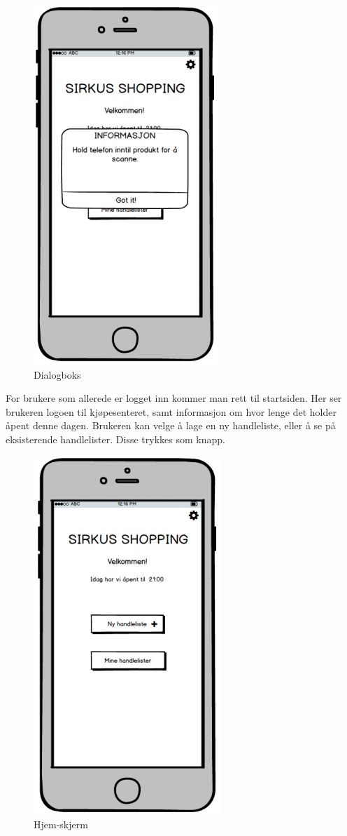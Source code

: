 \begin{figure}[H]
\includegraphics[scale=0.47]{images/prototype1/dialogboks}
\centering %
\caption{Dialogboks}
\label{fig:dialogboks}
\end{figure}

\noindent For brukere som allerede er logget inn kommer man rett til startsiden. Her ser brukeren logoen til kjøpesenteret, samt informasjon om hvor lenge det holder åpent denne dagen. Brukeren kan velge å lage en ny handleliste, eller å se på eksisterende handlelister. Disse trykkes som knapp. 

\begin{figure}[H]
\includegraphics[scale=0.47]{images/prototype1/hjem-skjerm}
\centering %
\caption{Hjem-skjerm}
\label{fig:hjem-skjerm}
\end{figure}


